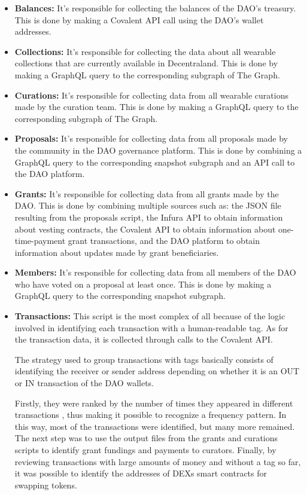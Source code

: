 \documentclass[MSE,Master,english]{twbook}%
\begin{document}
\begin{itemize}
  \item \textbf{Balances:} It's responsible for collecting the balances of the DAO's treasury. This is done by making a Covalent API call using the DAO's wallet addresses.
  \item \textbf{Collections:} It's responsible for collecting the data about all wearable collections that are currently available in Decentraland. This is done by making a GraphQL query to the corresponding subgraph of The Graph.
  \item \textbf{Curations:} It's responsible for collecting data from all wearable curations made by the curation team. This is done by making a GraphQL query to the corresponding subgraph of The Graph.
  \item \textbf{Proposals:} It's responsible for collecting data from all proposals made by the community in the DAO governance platform. This is done by combining a GraphQL query to the corresponding snapshot subgraph and an API call to the DAO platform.
  \item \textbf{Grants:} It's responsible for collecting data from all grants made by the DAO. This is done by combining multiple sources such as: the JSON file resulting from the proposals script, the Infura API to obtain information about vesting contracts, the Covalent API to obtain information about one-time-payment grant transactions, and the DAO platform to obtain information about updates made by grant beneficiaries.
  \item \textbf{Members:} It's responsible for collecting data from all members of the DAO who have voted on a proposal at least once. This is done by making a GraphQL query to the corresponding snapshot subgraph.
  \item \textbf{Transactions:} This script is the most complex of all because of the logic involved in identifying each transaction with a human-readable tag. As for the transaction data, it is collected through calls to the Covalent API.

  The strategy used to group transactions with tags basically consists of identifying the receiver or sender address depending on whether it is an OUT or IN transaction of the DAO wallets.
  
  Firstly, they were ranked by the number of times they appeared in different transactions , thus making it possible to recognize a frequency pattern. In this way, most of the transactions were identified, but many more remained. The next step was to use the output files from the grants and curations scripts to identify grant fundings and payments to curators. Finally, by reviewing transactions with large amounts of money and without a tag so far, it was possible to identify the addresses of \ac{DEXs} smart contracts for swapping tokens.
  

\end{itemize}
\end{document}

